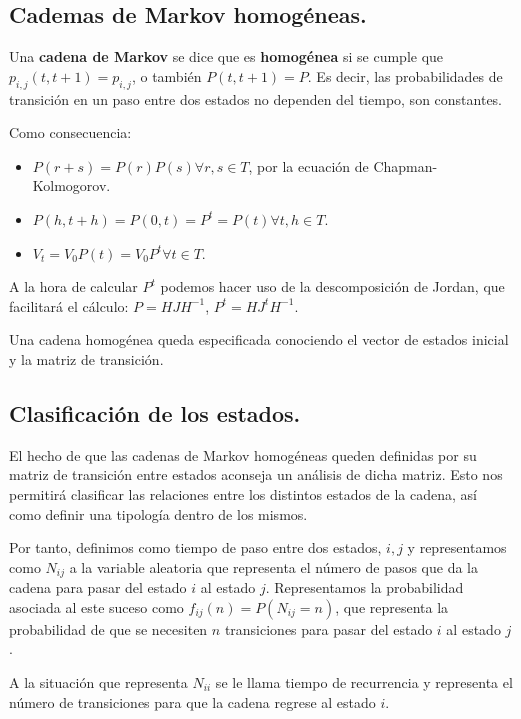\subsection{Cademas de Markov homog\'eneas.}

\begin{definicion}
Una \textbf{cadena de Markov} se dice que es \textbf{homog\'enea} si se cumple que $p_{i,j}(t,t+1)=p_{i,j}$, o tambi\'en $P(t,t+1)=P$. Es decir, las probabilidades de transici\'on en un paso entre dos estados no dependen del tiempo, son constantes.
\end{definicion}

Como consecuencia:
\begin{itemize}
\item $P(r+s)=P(r)P(s) \forall r,s\in T$, por la ecuaci\'on de Chapman-Kolmogorov.
\item $P(h,t+h)=P(0,t)=P^t=P(t) \forall t,h\in T$.
\item $V_t=V_0P(t)=V_0P^t \forall t\in T$.
\end{itemize}

A la hora de calcular $P^t$ podemos hacer uso de la descomposici\'on de Jordan, que facilitar\'a el c\'alculo: $P=HJH^{-1}$, $P^t=HJ^tH^{-1}$.

Una cadena homog\'enea queda especificada conociendo el vector de estados inicial y la matriz de transici\'on.

\subsection{Clasificaci\'on de los estados.}

El hecho de que las cadenas de Markov homog\'eneas queden definidas por su matriz de transici\'on entre estados aconseja un an\'alisis de dicha matriz. Esto nos permitir\'a clasificar las relaciones entre los distintos estados de la cadena, as\'i como definir una tipolog\'ia dentro de los mismos.

Por tanto, definimos como tiempo de paso entre dos estados, $i, j$ y representamos como $N_{ij}$ a la variable aleatoria que representa el n\'umero de pasos que da la cadena para pasar del estado $i$ al estado $j$. Representamos la probabilidad asociada al este suceso como $f_{ij}(n)=P(N_{ij}=n)$, que representa la probabilidad de que se necesiten $n$ transiciones para pasar del estado $i$ al estado $j$.

A la situaci\'on que representa $N_{ii}$ se le llama tiempo de recurrencia y representa el n\'umero de transiciones para que la cadena regrese al estado $i$.

